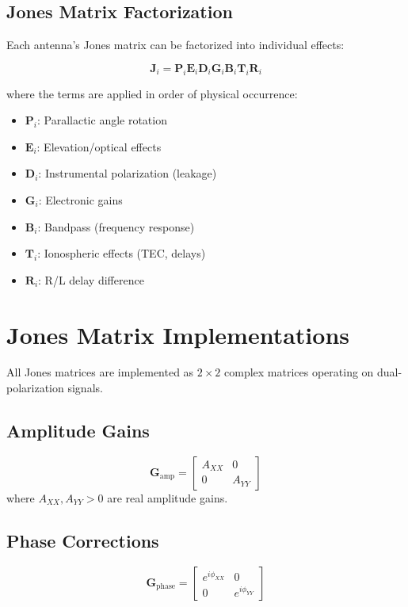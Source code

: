 \documentclass{aastex631}
\begin{document}
\subsection{Jones Matrix Factorization}

Each antenna's Jones matrix can be factorized into individual effects:

\begin{equation}
\mathbf{J}_i = \mathbf{P}_i \mathbf{E}_i \mathbf{D}_i \mathbf{G}_i \mathbf{B}_i \mathbf{T}_i \mathbf{R}_i
\end{equation}

where the terms are applied in order of physical occurrence:
\begin{itemize}
\item $\mathbf{P}_i$: Parallactic angle rotation
\item $\mathbf{E}_i$: Elevation/optical effects  
\item $\mathbf{D}_i$: Instrumental polarization (leakage)
\item $\mathbf{G}_i$: Electronic gains
\item $\mathbf{B}_i$: Bandpass (frequency response)
\item $\mathbf{T}_i$: Ionospheric effects (TEC, delays)
\item $\mathbf{R}_i$: R/L delay difference
\end{itemize}

\section{Jones Matrix Implementations}

All Jones matrices are implemented as $2 \times 2$ complex matrices operating on dual-polarization signals.

\subsection{Amplitude Gains}
\begin{equation}
\mathbf{G}_{\mathrm{amp}} = \begin{bmatrix} A_{XX} & 0 \\ 0 & A_{YY} \end{bmatrix}
\end{equation}
where $A_{XX}, A_{YY} > 0$ are real amplitude gains.

\subsection{Phase Corrections}
\begin{equation}
\mathbf{G}_{\mathrm{phase}} = \begin{bmatrix} e^{i\phi_{XX}} & 0 \\ 0 & e^{i\phi_{YY}} \end{bmatrix}
\end{equation}
\end{document}

